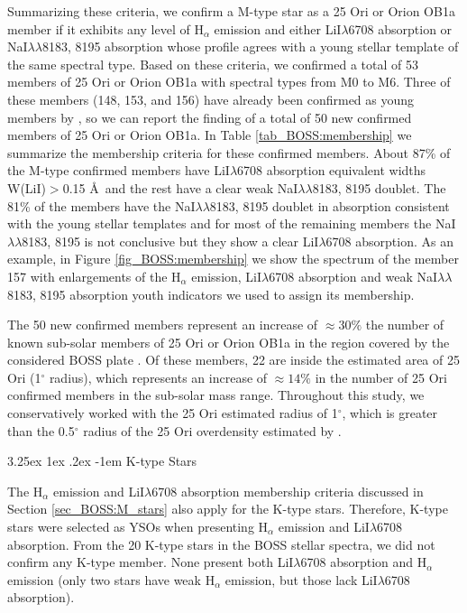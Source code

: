 \documentclass[12pt]{article}
\makeatletter
\renewcommand\paragraph{\@startsection{paragraph}{5}{\z@}%
  {3.25ex \@plus1ex \@minus.2ex}%
  {-1em}%
  {\normalfont\normalsize\bfseries}}
\makeatother
\begin{document}
Summarizing these criteria, we confirm a M-type star as a 25 Ori or Orion OB1a member if it exhibits any level of H$_\alpha$ emission and either LiI$\lambda$6708 absorption or NaI$\lambda\lambda$8183, 8195 absorption whose profile agrees with a young stellar template of the same spectral type. Based on these criteria, we confirmed a total of 53 members of 25 Ori or Orion OB1a with spectral types from M0 to M6. Three of these members (148, 153, and 156) have already been confirmed as young members by \citet{Downes2014}, so we can report the finding of a total of 50 new confirmed members of 25 Ori or Orion OB1a. In Table \ref{tab_BOSS:membership} we summarize the membership criteria for these confirmed members. About 87\% of the M-type confirmed members have LiI$\lambda$6708 absorption equivalent widths W(LiI)$>$0.15 \AA\ and the rest have a clear weak NaI$\lambda\lambda$8183, 8195 doublet. The 81\% of the members have the NaI$\lambda\lambda$8183, 8195 doublet in absorption consistent with the young stellar templates and for most of the remaining members the NaI$\lambda\lambda$8183, 8195 is not conclusive but they show a clear LiI$\lambda$6708 absorption. As an example, in Figure \ref{fig_BOSS:membership} we show the spectrum of the member 157 with enlargements of the H$_\alpha$ emission, LiI$\lambda$6708 absorption and weak NaI$\lambda\lambda$8183, 8195 absorption youth indicators we used to assign its membership.

The 50 new confirmed members represent an increase of $\approx 30\%$ the number of known sub-solar members of 25 Ori or Orion OB1a in the region covered by the considered BOSS plate \citep{Briceno2005,Briceno2007,Hernandez2007b,Downes2014,Downes2015}. Of these members, 22 are inside the \citet{Briceno2005,Briceno2007} estimated area of 25 Ori (1$^\circ$ radius), which represents an increase of $\approx 14\%$ in the number of 25 Ori confirmed members in the sub-solar mass range. Throughout this study, we conservatively worked with the 25 Ori estimated radius of 1$^\circ$, which is greater than the 0.5$^\circ$ radius of the 25 Ori overdensity estimated by \citet{Downes2014}.

\paragraph{K-type Stars\\}
\label{sec_BOSS:K_stars}

The H$_\alpha$ emission and LiI$\lambda$6708 absorption membership criteria discussed in Section \ref{sec_BOSS:M_stars} also apply for the K-type stars. Therefore, K-type stars were selected as YSOs when presenting H$_\alpha$ emission and LiI$\lambda$6708 absorption. From the 20 K-type stars in the BOSS stellar spectra, we did not confirm any K-type member. None present both LiI$\lambda$6708 absorption and H$_\alpha$ emission (only two stars have weak H$_\alpha$ emission, but those lack LiI$\lambda$6708 absorption).
\end{document}
